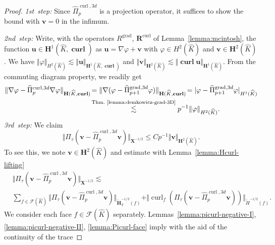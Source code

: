 \documentclass{article}
\newcommand{\hatPicurlcom}{\widehat \Pi^{\operatorname*{curl},3d}_p}
\newcommand{\hatPigradcom}{\widehat\Pi^{\operatorname*{grad},3d}_{p+1}}
\begin{document}
\begin{proof}
\emph{1st~step:} Since $\hatPicurlcom$ is a projection operator, it suffices to show the bound
with ${\mathbf v} = 0$ in the infimum.

\emph{2nd~step:} Write, with the operators $R^{\operatorname*{grad}}$,
${\mathbf{R}}^{\operatorname*{curl}}$ of Lemma~\ref{lemma:mcintosh}, the
function ${\mathbf{u}}\in{\mathbf{H}}^{1}(\widehat{K},\operatorname{\mathbf{curl}})$ as
${\mathbf{u}}=\nabla\varphi+{\mathbf{v}}$ with $\varphi\in H^{2}(\widehat{K})$
and ${\mathbf{v}}\in{\mathbf{H}}^{2}(\widehat{K})$. We have $\Vert\varphi
\Vert_{H^{2}(\widehat{K})}\lesssim\Vert{\mathbf{u}}\Vert_{{\mathbf{H}}%
^{1}(\widehat{K},\operatorname{\mathbf{curl}})}$ and $\Vert{\mathbf{v}}\Vert
_{{\mathbf{H}}^{2}(\widehat{K})}\lesssim\Vert\operatorname{\mathbf{curl}}{\mathbf{u}%
}\Vert_{{\mathbf{H}}^{1}(\widehat{K})}$. From the commuting diagram property,
we readily get
\begin{align*}
\Vert\nabla\varphi-\hatPicurlcom\nabla
\varphi\Vert_{{\mathbf{H}}(\widehat{K},\operatorname{\mathbf{curl}})}\!&=\Vert
\nabla(\varphi-\hatPigradcom\varphi)\Vert
_{{\mathbf{H}}(\widehat{K},\operatorname{\mathbf{curl}})}\!=|\varphi-\hatPigradcom\varphi|_{H^{1}(\widehat{K})} \\
& \stackrel{\text{Thm.~\ref{lemma:demkowicz-grad-3D}}}{\lesssim} p^{-1}%
\Vert\varphi\Vert_{H^{2}(\widehat{K})}.
\end{align*}
\emph{3rd~step:} We claim
\begin{equation}
\Vert\Pi_{\tau}({\mathbf{v}}-\hatPicurlcom{\mathbf{v}})\Vert_{{\mathbf{X}}^{-1/2}}\leq Cp^{-1}\Vert{\mathbf{v}}%
\Vert_{{\mathbf{H}}^{2}(\widehat{K})}. \label{eq:thm:H1curl-approximation-30}%
\end{equation}
To see this, we note ${\mathbf{v}}\in{\mathbf{H}}^{2}(\widehat{K})$ and
estimate with Lemma~\ref{lemma:Hcurl-lifting}
\begin{align*}
&\Vert\Pi_{\tau}({\mathbf{v}}-\hatPicurlcom{\mathbf{v}})\Vert_{{\mathbf{X}}^{-1/2}}\lesssim\\
& \sum_{f\in{\mathcal{F}%
}(\widehat{K})}\Vert\Pi_{\tau}({\mathbf{v}}-\hatPicurlcom{\mathbf{v}})\Vert_{\widetilde{\mathbf{H}}_T^{-1/2}%
(f)}+\Vert\operatorname{curl}_{f}(\Pi_{\tau}({\mathbf{v}}-\hatPicurlcom{\mathbf{v}}))\Vert_{\widetilde{H}^{-1/2}(f)}.
\end{align*}
We consider each face $f\in{\mathcal{F}}(\widehat{K})$ separately.
Lemmas~\ref{lemma:picurl-negative-I}, \ref{lemma:picurl-negative-II}, \ref{lemma:Picurl-face} imply with 
the aid of the continuity of the trace 

\end{proof}
\end{document}
